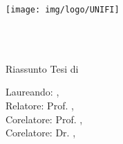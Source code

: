 
\begin{center}

\texttt{[image: img/logo/UNIFI]}

\small

\myFaculty \\
\myDegree \\
\myYear

\medskip

\begingroup \color{Maroon}
Riassunto Tesi di \myDegreeLevel \\
\spacedallcaps{\myItalianTitle} 
\endgroup

\medskip

Laureando: \textit{\myName}, \myMail \\
Relatore: Prof. \textit{\myProf}, \myProfMail \\
Corelatore: Prof. \textit{\myCorelatore}, \myCorelatoreMail \\ 
Corelatore:	Dr. \textit{\myOtherCorelatore}, \myOtherCorelatoreMail

\end{center}

